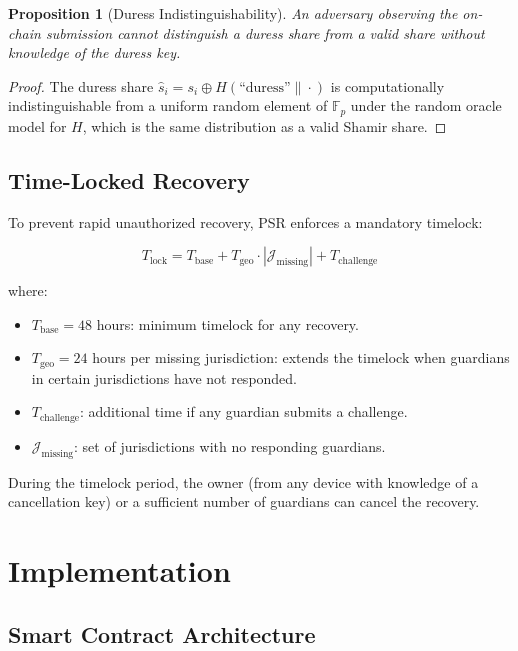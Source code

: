 \documentclass[11pt,a4paper,twocolumn]{article}
\newtheorem{proposition}[theorem]{Proposition}
\begin{document}
\begin{proposition}[Duress Indistinguishability]
An adversary observing the on-chain submission cannot distinguish a duress share from a valid share without knowledge of the duress key.
\end{proposition}

\begin{proof}
The duress share $\hat{s}_i = s_i \oplus H(\text{``duress''} \| \cdot)$ is computationally indistinguishable from a uniform random element of $\mathbb{F}_p$ under the random oracle model for $H$, which is the same distribution as a valid Shamir share.
\end{proof}

\subsection{Time-Locked Recovery}

To prevent rapid unauthorized recovery, PSR enforces a mandatory timelock:

\begin{equation}
  T_{\text{lock}} = T_{\text{base}} + T_{\text{geo}} \cdot |\mathcal{J}_{\text{missing}}| + T_{\text{challenge}}
\end{equation}

where:
\begin{itemize}
  \item $T_{\text{base}} = 48$ hours: minimum timelock for any recovery.
  \item $T_{\text{geo}} = 24$ hours per missing jurisdiction: extends the timelock when guardians in certain jurisdictions have not responded.
  \item $T_{\text{challenge}}$: additional time if any guardian submits a challenge.
  \item $\mathcal{J}_{\text{missing}}$: set of jurisdictions with no responding guardians.
\end{itemize}

During the timelock period, the owner (from any device with knowledge of a cancellation key) or a sufficient number of guardians can cancel the recovery.

\section{Implementation}\label{sec:implementation}

\subsection{Smart Contract Architecture}
\end{document}
